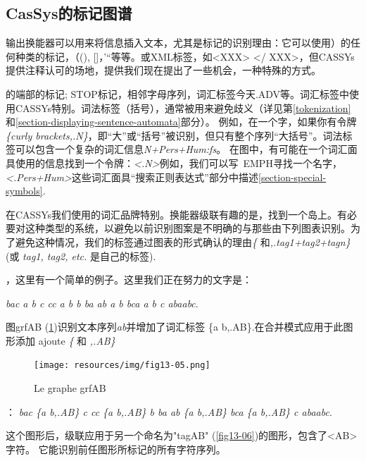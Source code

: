 \subsection{CasSys的标记图谱}

输出换能器可以用来将信息插入文本，尤其是标记的识别理由：它可以使用）的任何种类的标记，（(), []，'“等等。或XML标签，如<XXX> </ XXX>，但CASSYs提供注释认可的场地，提供我们现在提出了一些机会，一种特殊的方式。 

\bigskip
{}的端部的标记; {STOP}标记，相邻字母序列，词汇标签{今天.ADV}等。词汇标签中使用CASSYs特别。词法标签（括号），通常被用来避免歧义（详见第\ref{tokenization}和\ref{section-displaying-sentence-automata}部分）。
例如，在一个字，如果你有令牌\emph{\{curly brackets,.N\}}，即“大”或“括号”被识别，但只有整个序列“大括号”。词法标签可以包含一个复杂的词汇信息\emph{N+Pers+Hum:fs}。
在图中，有可能在一个词汇面具使用的信息找到一个令牌：\emph{<.N>}例如，我们可以写\ EMPH寻找一个名字，\emph{<.Pers+Hum>}这些词汇面具“搜索正则表达式”部分中描述\ref{section-special-symbols}.
 
\bigskip
\noindent 在CASSYs我们使用的词汇品牌特别。换能器级联有趣的是，找到一个岛上。有必要对这种类型的系统，以避免以前识别图案是不明确的与那些由下列图表识别。为了避免这种情况，我们的标签通过图表的形式确认的理由\emph{\{} 和\emph{,.tag1+tag2+tagn\}} (或 \emph{tag1, tag2, etc.} 是自己的标签).

\bigskip
{}，这里有一个简单的例子。这里我们正在努力的文字是：

\emph{bac a b c cc a b b ba ab a b bca a b c abaabc}.

\bigskip
\noindent 图grfAB (\ref{fig13-05})识别文本序列\emph{ab}并增加了词汇标签 \{a b,.AB\}.在合并模式应用于此图形添加 ajoute \emph{\{ } 和 \emph{,.AB\}} 
\begin{figure}[!htb]
  \centering
  \texttt{[image: resources/img/fig13-05.png]}
  \caption{Le graphe grfAB}
  \label{fig13-05}
\end{figure}

\bigskip
{}： \emph{bac \{a b,.AB\} c cc \{a b,.AB\} b ba ab \{a b,.AB\} bca \{a b,.AB\} c abaabc}.

\bigskip

\bigskip
\noindent 这个图形后，级联应用于另一个命名为"tagAB" (\ref{fig13-06})的图形，包含了<AB>字符。
它能识别前任图形所标记的所有字符序列。


